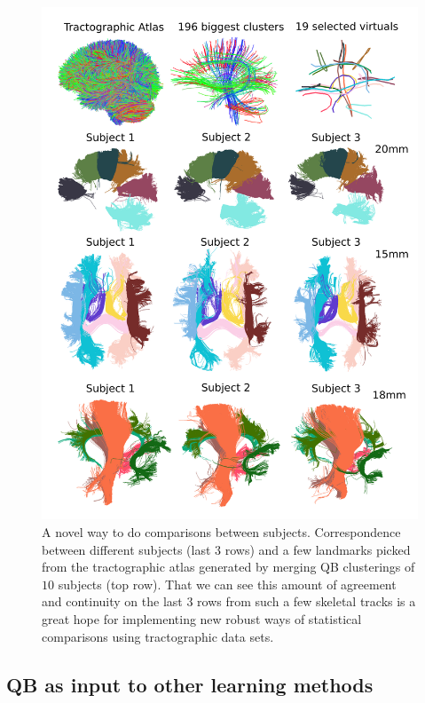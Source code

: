 \documentclass[preprint,authoryear,a4paper,10pt,onecolumn]{elsarticle}
\begin{document}
%
\begin{figure}
\begin{centering}
\includegraphics[scale=0.7]{last_figures/close_distance}
\par\end{centering}

\label{Flo:CloseToSelected}
\caption{A novel way to do comparisons between subjects. Correspondence
  between different subjects (last $3$ rows) and a few landmarks picked
  from the tractographic atlas generated by merging QB clusterings of
  $10$ subjects (top row). That we can see this amount of agreement and
  continuity on the last $3$ rows from such a few skeletal tracks is a
  great hope for implementing new robust ways of statistical comparisons
  using tractographic data sets.}

\end{figure}

\subsection{QB as input to other learning methods}
\end{document}

